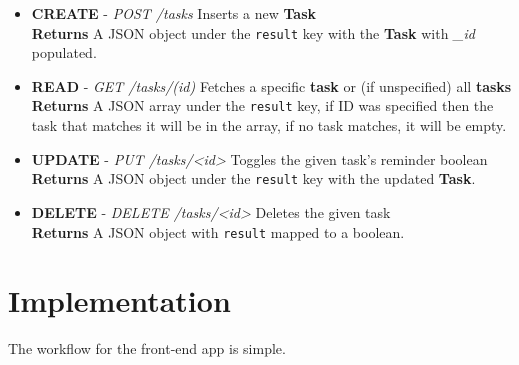 \documentclass{article}
\begin{document}
\begin{itemize}
    \item \textbf{CREATE} - \textit{POST /tasks} Inserts a new \textbf{Task} \\
          \textbf{Returns}
          A JSON object under the \lstinline|result| key with the \textbf{Task} with \textit{\_id} populated. \\
    \item \textbf{READ} - \textit{GET /tasks/(id)} Fetches a specific \textbf{task} or (if unspecified) all \textbf{tasks} \\
          \textbf{Returns}
          A JSON array under the \lstinline|result| key, if ID was specified then the task that matches it will be in the array, if no task matches, it will be empty.
    \item \textbf{UPDATE} - \textit{PUT /tasks/\textless id\textgreater} Toggles the given task's reminder boolean \\
          \textbf{Returns}
          A JSON object under the \lstinline|result| key with the updated \textbf{Task}. \\
    \item \textbf{DELETE} - \textit{DELETE /tasks/\textless id\textgreater} Deletes the given task \\
          \textbf{Returns}
          A JSON object with \lstinline|result| mapped to a boolean.
\end{itemize}

\pagebreak

\section{Implementation}
The workflow for the front-end app is simple.
\end{document}
